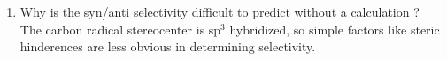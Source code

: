 \documentclass{article}
\begin{document}
\begin{enumerate}
	\item Why is the syn/anti selectivity difficult to predict without a calculation ? \\
	The carbon radical stereocenter is sp$^3$ hybridized, so simple factors like steric hinderences are less obvious in determining selectivity.
	
\end{enumerate}

\enddocument
\end{document}

